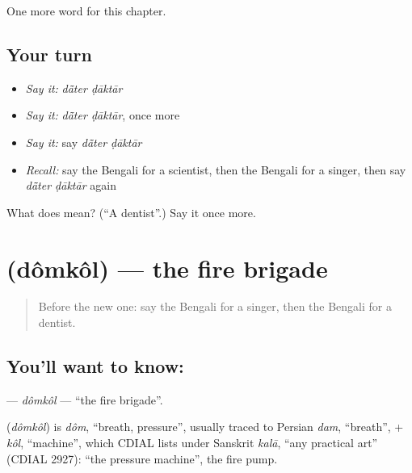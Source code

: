\begin{grammarlens}[title={What you've built}]
One more word for this chapter.
\end{grammarlens}

\subsection*{Your turn}
\begin{itemize}
\raggedright
  \item \emph{Say it:} \emph{dā̃ter ḍāktār}
  \item \emph{Say it:} \emph{dā̃ter ḍāktār}, once more
  \item \emph{Say it:} say \emph{dā̃ter ḍāktār}
  \item \emph{Recall:} say the Bengali for a scientist, then the Bengali for a singer, then say \emph{dā̃ter ḍāktār} again
\end{itemize}

\begin{tcolorbox}[breakable,colback=teal!4,colframe=teal!35!black,title={Before you move on}]
What does   mean? (\textquotedblleft{}A dentist\textquotedblright{}.) Say it once more.
\end{tcolorbox}
\section[\texorpdfstring{\bn{দমকল} (dômkôl)}{দমকল (dômkôl)}]{ (dômkôl) — the fire brigade}

\label{lesson:BN-C178-domkol}



\begin{quote}
Before the new one: say the Bengali for a singer, then the Bengali for a dentist.
\end{quote}

\subsection*{You'll want to know: }
\textbf{} — \emph{dômkôl} — \textquotedblleft{}the fire brigade\textquotedblright{}.

\begin{cousinweb}
\textbf{} (\emph{dômkôl}) is \emph{dôm}, \textquotedblleft{}breath, pressure\textquotedblright{}, usually traced to Persian \emph{dam}, \textquotedblleft{}breath\textquotedblright{}, + \emph{kôl}, \textquotedblleft{}machine\textquotedblright{}, which CDIAL lists under Sanskrit \emph{kalā}, \textquotedblleft{}any practical art\textquotedblright{} (CDIAL 2927): \textquotedblleft{}the pressure machine\textquotedblright{}, the fire pump.
\end{cousinweb}

